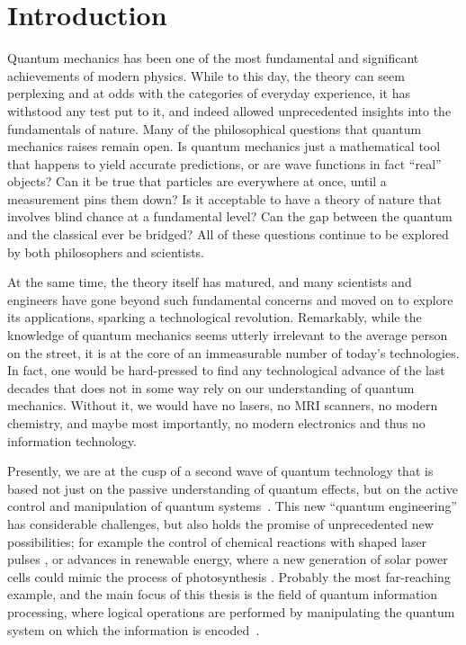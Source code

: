 \chapter{Introduction}
\label{chap:intro}

Quantum mechanics has been one of the most fundamental and significant
achievements of modern physics. While to this day, the theory can seem
perplexing and at odds with the categories of everyday experience, it has
withstood any test put to it, and indeed allowed unprecedented insights into the
fundamentals of nature. Many of the philosophical questions that quantum
mechanics raises remain open. Is quantum mechanics just a mathematical tool
that happens to yield accurate predictions, or are wave functions in fact
``real'' objects?  Can it be true that particles are everywhere at once, until
a measurement pins them down? Is it acceptable to have a theory of nature that
involves blind chance at a fundamental level? Can the gap between the quantum
and the classical ever be bridged? All of these questions continue to be
explored by both philosophers and scientists.

At the same time, the theory itself has matured, and many scientists and
engineers have gone beyond such fundamental concerns and moved on to explore its
applications, sparking a technological revolution. Remarkably, while the
knowledge of quantum mechanics seems utterly irrelevant to the average person on
the street, it is at the core of an immeasurable number of today's technologies.
In fact, one would be hard-pressed to find any technological advance of the last
decades that does not in some way rely on our understanding of quantum
mechanics.  Without it, we would have no lasers, no MRI scanners, no modern
chemistry, and maybe most importantly, no modern electronics and thus no
information technology.

Presently, we are at the cusp of a second wave of quantum technology that is
based not just on the passive understanding of quantum effects, but on the
active control and manipulation of quantum systems~\cite{DowlingPTRSA2003}.
This new ``quantum engineering'' has considerable challenges, but also holds the
promise of unprecedented new possibilities; for example the
control of chemical reactions with shaped laser pulses
\cite{BrumerShapiro}, or advances in renewable energy, where a new generation of
solar power cells could mimic the process of photosynthesis
\cite{ColliniScience09, SarovarNatPhys10}.  Probably the most far-reaching
example, and the main focus of this thesis is the field of quantum information
processing, where logical operations are performed by manipulating the quantum
system on which the information is encoded~\cite{NielsenChuang}.

